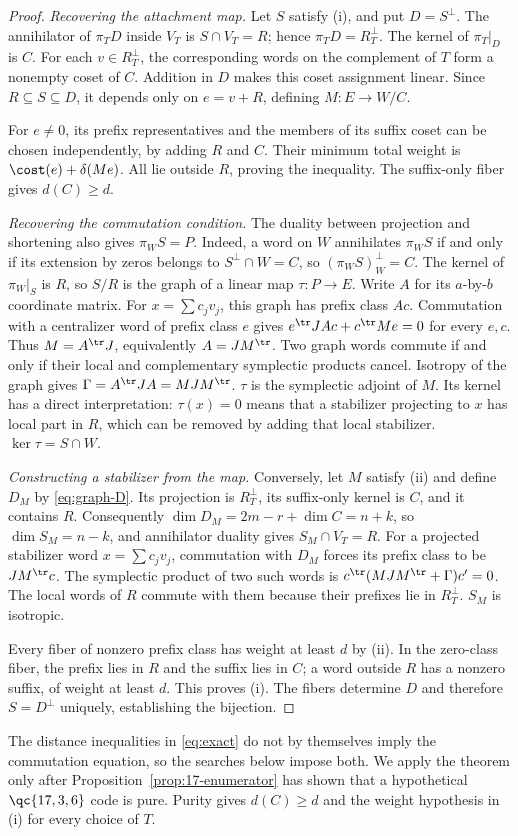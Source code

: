 \begin{proof}
\emph{Recovering the attachment map.}
Let \(S\) satisfy (i), and put \(D=S^\perp\). The annihilator of
\(\pi_TD\) inside \(V_T\) is \(S\cap V_T=R\); hence
\(\pi_TD=R_T^\perp\). The kernel of \(\pi_T|_D\) is \(C\).
For each \(v\in R_T^\perp\), the corresponding words on the
complement of \(T\) form a nonempty coset of \(C\). Addition in \(D\) makes this coset assignment linear. Since \(R\subseteq S\subseteq D\), it depends only
on \(e=v+R\), defining \(M:E\to W/C\).

For \(e\ne0\), its prefix representatives and the members of its suffix
coset can be chosen independently, by adding \(R\) and \(C\).
Their minimum total weight is
\(\cost(e)+\delta(Me)\). All lie outside \(R\), proving the inequality.
The suffix-only fiber gives \(d(C)\geq d\).

\emph{Recovering the commutation condition.}
The duality between projection and shortening also gives \(\pi_WS=P\). Indeed,
a word on \(W\) annihilates \(\pi_WS\) if and only if its extension
by zeros belongs to \(S^\perp\cap W=C\), so
\((\pi_WS)^\perp_W=C\). The kernel of
\(\pi_W|_S\) is \(R\), so \(S/R\) is the graph of a linear map
\(\tau:P\to E\). Write \(A\) for its \(a\)-by-\(b\) coordinate matrix.
For \(x=\sum c_jv_j\), this graph has prefix class \(Ac\).
Commutation with a centralizer word of prefix class \(e\) gives
\(e^\tr JAc+c^\tr Me=0\) for every \(e,c\). Thus
\(M=A^\tr J\), equivalently \(A=JM^\tr\). Two graph words
commute if and only if their local and complementary symplectic products
cancel. Isotropy of the graph gives
\(\Gamma=A^\tr JA=MJM^\tr\). \(\tau\) is the symplectic
adjoint of \(M\).
Its kernel has a direct interpretation: \(\tau(x)=0\) means that
a stabilizer projecting to \(x\) has local part in \(R\), which can
be removed by adding that local stabilizer. \(\ker\tau=S\cap W\).

\emph{Constructing a stabilizer from the map.}
Conversely, let \(M\) satisfy (ii) and define \(D_M\) by
\eqref{eq:graph-D}. Its projection is \(R_T^\perp\), its suffix-only
kernel is \(C\), and it contains \(R\). Consequently
\(\dim D_M=2m-r+\dim C=n+k\), so \(\dim S_M=n-k\),
and annihilator duality gives \(S_M\cap V_T=R\).
For a projected stabilizer word \(x=\sum c_jv_j\), commutation with
\(D_M\) forces its prefix class to be \(JM^\tr c\). The symplectic product of
two such words is
\(c^\tr(MJM^\tr+\Gamma)c'=0\). The local words of \(R\) commute
with them because their prefixes lie in \(R_T^\perp\). \(S_M\)
is isotropic.

Every fiber of nonzero prefix class has weight at least \(d\) by (ii).
In the zero-class fiber, the prefix lies in \(R\) and the suffix lies in
\(C\); a word outside \(R\) has a nonzero suffix, of weight at least
\(d\). This proves (i). The fibers determine \(D\) and therefore
\(S=D^\perp\) uniquely, establishing the bijection.
\end{proof}

The distance inequalities in \eqref{eq:exact} do not by themselves imply
the commutation equation, so the searches below impose both.
We apply the theorem only after Proposition~\ref{prop:17-enumerator}
has shown that a hypothetical \(\qc{17,3,6}\) code is pure. Purity gives
\(d(C)\geq d\) and the weight hypothesis in (i) for every choice of \(T\).
